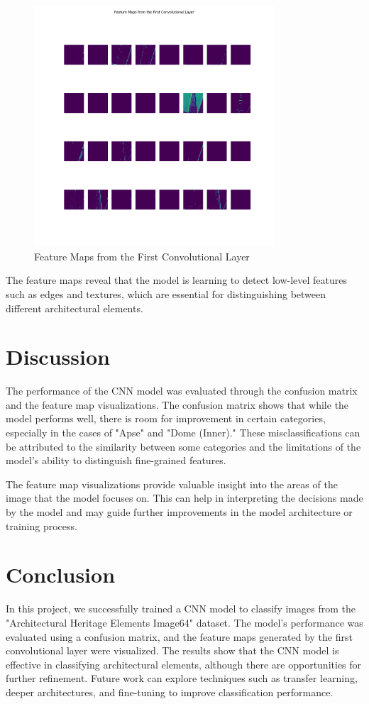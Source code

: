 \documentclass[12pt]{article}
\begin{document}
\begin{figure}[H]
    \centering
    \includegraphics[width=0.8\textwidth]{feature_maps_layer1.png}
    \caption{Feature Maps from the First Convolutional Layer}
\end{figure}

The feature maps reveal that the model is learning to detect low-level features such as edges and textures, which are essential for distinguishing between different architectural elements.

\section{Discussion}
The performance of the CNN model was evaluated through the confusion matrix and the feature map visualizations. The confusion matrix shows that while the model performs well, there is room for improvement in certain categories, especially in the cases of "Apse" and "Dome (Inner)." These misclassifications can be attributed to the similarity between some categories and the limitations of the model's ability to distinguish fine-grained features.

The feature map visualizations provide valuable insight into the areas of the image that the model focuses on. This can help in interpreting the decisions made by the model and may guide further improvements in the model architecture or training process.

\section{Conclusion}
In this project, we successfully trained a CNN model to classify images from the "Architectural Heritage Elements Image64" dataset. The model's performance was evaluated using a confusion matrix, and the feature maps generated by the first convolutional layer were visualized. The results show that the CNN model is effective in classifying architectural elements, although there are opportunities for further refinement. Future work can explore techniques such as transfer learning, deeper architectures, and fine-tuning to improve classification performance.
\end{document}
